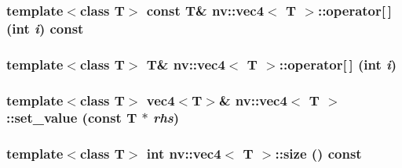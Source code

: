 \hypertarget{classnv_1_1vec4_36ba5d7380e6d8c87c12f7b5b60add54}{
\subsubsection[{operator[]}]{\setlength{\rightskip}{0pt plus 5cm}template$<$class T$>$ const T\& {\bf nv::vec4}$<$ T $>$::operator\mbox{[}$\,$\mbox{]} (int {\em i}) const}}
\label{classnv_1_1vec4_36ba5d7380e6d8c87c12f7b5b60add54}


\hypertarget{classnv_1_1vec4_dab48546512b2c5a4f359061441fa661}{
\subsubsection[{operator[]}]{\setlength{\rightskip}{0pt plus 5cm}template$<$class T$>$ T\& {\bf nv::vec4}$<$ T $>$::operator\mbox{[}$\,$\mbox{]} (int {\em i})}}
\label{classnv_1_1vec4_dab48546512b2c5a4f359061441fa661}


\hypertarget{classnv_1_1vec4_3ff55b6469beb2b7ac4abb389cc91921}{
\subsubsection[{set\_\-value}]{\setlength{\rightskip}{0pt plus 5cm}template$<$class T$>$ {\bf vec4}$<$T$>$\& {\bf nv::vec4}$<$ T $>$::set\_\-value (const T $\ast$ {\em rhs})}}
\label{classnv_1_1vec4_3ff55b6469beb2b7ac4abb389cc91921}


\hypertarget{classnv_1_1vec4_156fc0ecb56f75f2527c566c8006242c}{
\subsubsection[{size}]{\setlength{\rightskip}{0pt plus 5cm}template$<$class T$>$ int {\bf nv::vec4}$<$ T $>$::size () const}}
\label{classnv_1_1vec4_156fc0ecb56f75f2527c566c8006242c}




